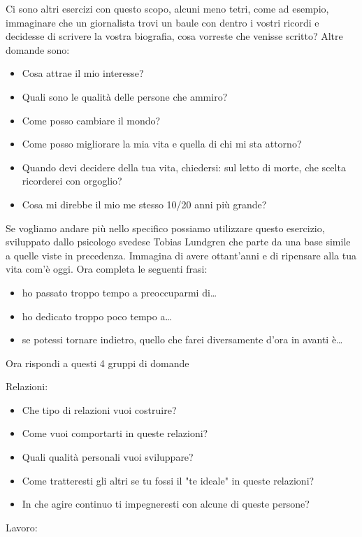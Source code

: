 \documentclass[12pt]{book} %
\begin{document}
Ci sono altri esercizi con questo scopo, alcuni meno tetri, come ad esempio, immaginare che un giornalista trovi un
baule con dentro i vostri ricordi e decidesse di scrivere la vostra biografia, cosa vorreste che venisse scritto? Altre
domande sono:

\begin{itemize}
\item Cosa attrae il mio interesse?
\item Quali sono le qualità delle persone che ammiro?
\item Come posso cambiare il mondo?
\item Come posso migliorare la mia vita e quella di chi mi sta attorno? 
\item Quando devi decidere della tua vita, chiedersi: sul letto di morte, che scelta ricorderei con orgoglio? 
\item Cosa mi direbbe il mio me stesso 10/20 anni più grande?
\end{itemize}
Se vogliamo andare più nello specifico possiamo utilizzare questo esercizio, sviluppato dallo psicologo svedese Tobias
Lundgren che parte da una base simile a quelle viste in precedenza. Immagina di avere ottant'anni
e di ripensare alla tua vita com'è oggi. Ora completa le seguenti frasi:

\begin{itemize}
\item ho passato troppo tempo a preoccuparmi di… 
\item ho dedicato troppo poco tempo a… 
\item se potessi tornare indietro, quello che farei diversamente d'ora in avanti è…
\end{itemize}

\bigskip

Ora rispondi a questi 4 gruppi di domande

Relazioni:

\begin{itemize}
\item Che tipo di relazioni vuoi costruire? 
\item Come vuoi comportarti in queste relazioni? 
\item Quali qualità personali vuoi sviluppare? 
\item Come tratteresti gli altri se tu fossi il "te ideale" in queste
relazioni? 
\item In che agire continuo ti impegneresti con alcune di queste persone?
\end{itemize}
Lavoro:
\end{document}
